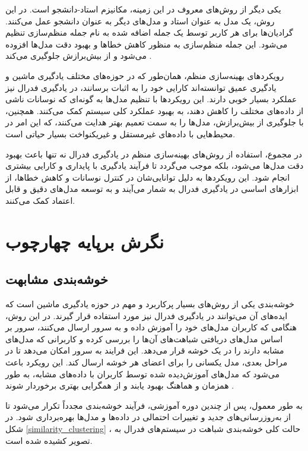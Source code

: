 یکی دیگر از روش‌های معروف در این زمینه، مکانیزم استاد-دانشجو%
است. در این روش، یک مدل به عنوان استاد و مدل‌های دیگر به عنوان دانشجو عمل می‌کنند. گرادیان‌ها برای هر کاربر توسط یک جمله اضافه شده به نام جمله منظم‌سازی%
تنظیم می‌شود. این جمله منظم‌سازی به منظور کاهش خطاها و بهبود دقت مدل‌ها افزوده می‌شود و از بیش‌برازش%
جلوگیری می‌کند
\cite{li2020communication}.

رویکردهای بهینه‌سازی منظم، همان‌طور که در حوزه‌های مختلف یادگیری ماشین و یادگیری عمیق توانسته‌اند کارایی خود را به اثبات برسانند، در یادگیری فدرال نیز عملکرد بسیار خوبی دارند. این رویکردها با تنظیم مدل‌ها به گونه‌ای که نوسانات ناشی از داده‌های مختلف را کاهش دهند، به بهبود عملکرد کلی سیستم کمک می‌کنند. همچنین، با جلوگیری از بیش‌برازش، مدل‌ها را به سمت تعمیم بهتر هدایت می‌کنند، که این امر در محیط‌هایی با داده‌های غیرمستقل و غیریکنواخت بسیار حیاتی است.

در مجموع، استفاده از روش‌های بهینه‌سازی منظم در یادگیری فدرال نه تنها باعث بهبود دقت مدل‌ها می‌شود، بلکه موجب می‌گردد تا فرآیند یادگیری با پایداری و کارایی بیشتری انجام شود. این رویکردها به دلیل توانایی‌شان در کنترل نوسانات و کاهش خطاها، از ابزارهای اساسی در یادگیری فدرال به شمار می‌آیند و به توسعه مدل‌های دقیق و قابل اعتماد کمک می‌کنند.



\section{نگرش برپایه چهارچوب}
\subsection{
	خوشه‌بندی مشابهت%
	\protect
}
خوشه‌بندی یکی از روش‌های بسیار پرکاربرد و مهم در حوزه یادگیری ماشین است که ایده‌های آن می‌توانند در یادگیری فدرال نیز مورد استفاده قرار گیرند. در این روش، هنگامی که کاربران مدل‌های خود را آموزش داده و به سرور ارسال می‌کنند، سرور بر اساس مدل‌های دریافتی شباهت‌های آن‌ها را بررسی کرده و کاربرانی که مدل‌های مشابه دارند را در یک خوشه قرار می‌دهد. این فرایند به سرور امکان می‌دهد تا در مراحل بعدی، مدل یکسانی را برای اعضای هر خوشه ارسال کند. این رویکرد باعث می‌شود که مدل‌های آموزش‌دیده شده توسط کاربران با داده‌های مشابه، به طور همزمان و هماهنگ بهبود یابند و از همگرایی بهتری برخوردار شوند
\cite{ghosh2019robust}.

به طور معمول، پس از چندین دوره آموزشی، فرآیند خوشه‌بندی مجدداً تکرار می‌شود تا از به‌روزرسانی‌های جدید و تغییرات احتمالی در داده‌ها و مدل‌ها بهره‌برداری شود. در شکل
\ref{similarity_clustering}%
، حالت کلی خوشه‌بندی شباهت در سیستم‌های فدرال به تصویر کشیده شده است.

